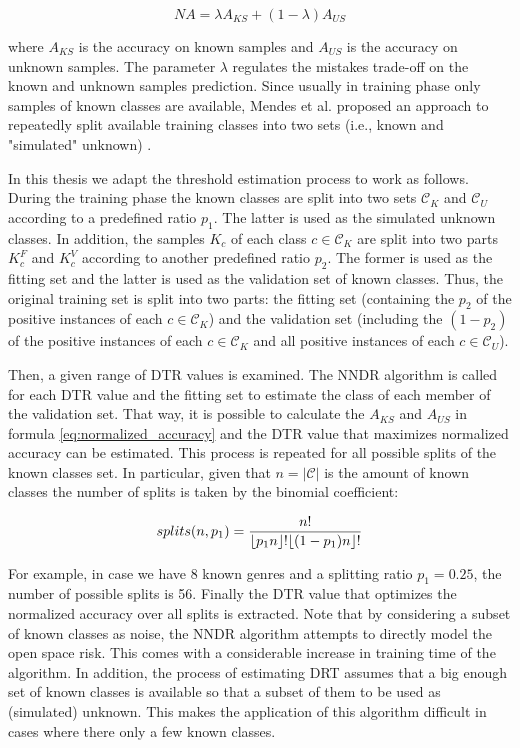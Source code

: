 \begin{equation}
\label{eq:normalized_accuracy}
NA = \lambda A_{KS} + (1 - \lambda) A_{US}
\end{equation}

\nointend where $A_{KS}$ is the accuracy on known samples and $A_{US}$ is the accuracy on unknown samples. The parameter $\lambda$ regulates the mistakes trade-off on the known and unknown samples prediction. Since usually in training phase only samples of known classes are available, Mendes et al. proposed an approach to repeatedly split available training classes into two sets (i.e., known and "simulated" unknown) \parencite{mendesjunior2016}. 

In this thesis we adapt the threshold estimation process to work as follows. During the training phase the known classes are split into two sets $\mathcal{C}_K$ and $\mathcal{C}_{U}$ according to a predefined ratio $p_1$. The latter is used as the simulated unknown classes. In addition, the samples $K_c$ of each class $c \in \mathcal{C}_K$ are split into two parts $K_c^F$ and $K_c^V$ according to another predefined ratio $p_2$. The former is used as the fitting set and the latter is used as the validation set of known classes. Thus, the original training set is split into two parts: the fitting set (containing the $p_2$ of the positive instances of each $c \in \mathcal{C}_K$) and the validation set (including the $(1-p_2)$ of the positive instances of each $c \in \mathcal{C}_K$ and all positive instances of each $c \in \mathcal{C}_U$). 

Then, a given range of DTR values is examined. The NNDR algorithm is called for each DTR value and the fitting set to estimate the class of each member of the validation set. That way, it is possible to calculate the $A_{KS}$ and $A_{US}$ in formula \ref{eq:normalized_accuracy} and the DTR value that maximizes normalized accuracy can be estimated. This process is repeated for all possible splits of the known classes set. In particular, given that $n = |\mathcal{C}|$ is the amount of known classes the number of splits is taken by the binomial coefficient:

\begin{equation} \label{eq:splt}
    splits(n,p_1) = \frac{n!}{\floor*{p_1n}!\floor*{(1-p_1)n}!}
\end{equation}

For example, in case we have 8 known genres and a splitting ratio $p_1=0.25$, the number of possible splits is 56. Finally the DTR value that optimizes the normalized accuracy over all splits is extracted. Note that by considering a subset of known classes as noise, the NNDR algorithm attempts to directly model the open space risk. This comes with a considerable increase in training time of the algorithm. In addition, the process of estimating DRT assumes that a big enough set of known classes is available so that a subset of them to be used as (simulated) unknown. This makes the application of this algorithm difficult in cases where there only a few known classes.

